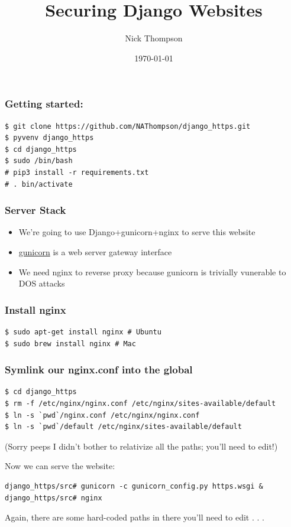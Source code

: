 \documentclass{beamer}
\begin{document}
\title{Securing Django Websites}
\author{Nick Thompson} 
\date{\today}

\frame{\titlepage}

\begin{frame}[fragile]
\frametitle{Getting started:}
\begin{verbatim}
$ git clone https://github.com/NAThompson/django_https.git
$ pyvenv django_https
$ cd django_https
$ sudo /bin/bash
# pip3 install -r requirements.txt
# . bin/activate
\end{verbatim}
\end{frame}

\begin{frame}
\frametitle{Server Stack}
\begin{itemize}
\item We're going to use Django+gunicorn+nginx to serve this website
\item \href{http://gunicorn.org/\#deployment}{gunicorn} is a web server gateway interface
\item We need nginx to reverse proxy because gunicorn is trivially vunerable to DOS attacks
\end{itemize}
\end{frame}

\begin{frame}[fragile]
\frametitle{Install nginx}
\begin{verbatim}
$ sudo apt-get install nginx # Ubuntu
$ sudo brew install nginx # Mac
\end{verbatim}
\end{frame}

\begin{frame}[fragile]
\frametitle{Symlink our nginx.conf into the global}
\begin{verbatim}
$ cd django_https
$ rm -f /etc/nginx/nginx.conf /etc/nginx/sites-available/default
$ ln -s `pwd`/nginx.conf /etc/nginx/nginx.conf
$ ln -s `pwd`/default /etc/nginx/sites-available/default
\end{verbatim}
(Sorry peeps I didn't bother to relativize all the paths; you'll need to edit!)
\end{frame}

\begin{frame}[fragile]
Now we can serve the website:
\begin{verbatim}
django_https/src# gunicorn -c gunicorn_config.py https.wsgi &
django_https/src# nginx
\end{verbatim}
Again, there are some hard-coded paths in there you'll need to edit . . .
\end{frame}
\end{document}
